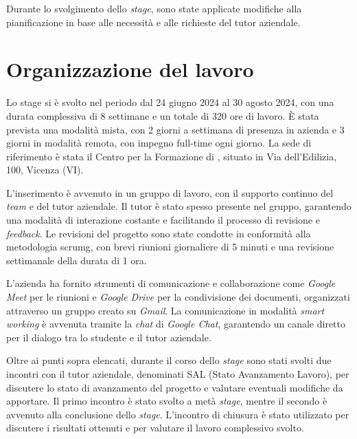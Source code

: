 Durante lo svolgimento dello \emph{stage}, sono state applicate modifiche alla pianificazione in base alle necessità e alle richieste del tutor aziendale.

\section{Organizzazione del lavoro}

Lo stage si è svolto nel periodo dal 24 giugno 2024 al 30 agosto 2024, con una durata complessiva di 8 settimane e un totale di 320 ore di lavoro. È stata prevista una modalità mista, con 2 giorni a settimana di presenza in azienda e 3 giorni in modalità remota, con impegno full-time ogni giorno. La sede di riferimento è stata il Centro per la Formazione di \myCompany, situato in Via dell'Edilizia, 100, Vicenza (VI).

L'inserimento è avvenuto in un gruppo di lavoro, con il supporto continuo del \emph{team} e del tutor aziendale. Il tutor è stato spesso presente nel gruppo, garantendo una modalità di interazione costante e facilitando il processo di revisione e \emph{feedback}. Le revisioni del progetto sono state condotte in conformità alla metodologia \gls{scrumg}, con brevi riunioni giornaliere di 5 minuti e una revisione settimanale della durata di 1 ora.

L'azienda ha fornito strumenti di comunicazione e collaborazione come \emph{Google Meet} per le riunioni e \emph{Google Drive} per la condivisione dei documenti, organizzati attraverso un gruppo creato su \emph{Gmail}. La comunicazione in modalità \emph{smart working} è avvenuta tramite la \emph{chat} di \emph{Google Chat}, garantendo un canale diretto per il dialogo tra lo studente e il tutor aziendale.

Oltre ai punti sopra elencati, durante il corso dello \emph{stage} sono stati svolti due incontri con il tutor aziendale, denominati SAL (Stato Avanzamento Lavoro), per discutere lo stato di avanzamento del progetto e valutare eventuali modifiche da apportare. Il primo incontro è stato svolto a metà \emph{stage}, mentre il secondo è avvenuto alla conclusione dello \emph{stage}. L'incontro di chiusura è stato utilizzato per discutere i risultati ottenuti e per valutare il lavoro complessivo svolto.